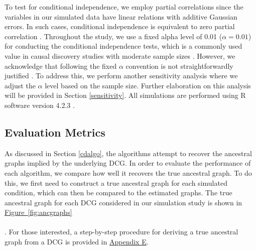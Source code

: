 \documentclass[twoside, 11pt]{article}
\newcommand*{\figref}[2][]{%
  \hyperref[{fig:#2}]{%
    Figure~\ref*{fig:#2}%
    \ifx\\#1\\%
    \else
      #1%
    \fi
  }%
}
\begin{document}
\restoregeometry %

To test for conditional independence, we employ partial correlations since the variables in our simulated data have linear relations with additive Gaussian errors. In such cases, conditional independence is equivalent to zero partial correlation \citep{lawrance_conditional_1976}. Throughout the study, we use a fixed alpha level of 0.01 ($\alpha = 0.01$) for conducting the conditional independence tests, which is a commonly used value in causal discovery studies with moderate sample sizes \citep{malinsky_causal_2018}. However, we acknowledge that following the fixed $\alpha$ convention is not straightforwardly justified \citep{strobl_estimating_2017}. To address this, we perform another sensitivity analysis where we adjust the $\alpha$ level based on the sample size. Further elaboration on this analysis will be provided in Section \ref{sensitivity}. All simulations are performed using R software version 4.2.3 \citep{R}.



\subsection{Evaluation Metrics} \label{eval}
As discussed in Section \ref{cdalgo}, the algorithms attempt to recover the ancestral graphs implied by the underlying DCG. In order to evaluate the performance of each algorithm, we compare how well it recovers the true ancestral graph. To do this, we first need to construct a true ancestral graph for each simulated condition, which can then be compared to the estimated graphs. The true ancestral graph for each DCG considered in our simulation study is shown in \figref[]{ancgraphs}. For those interested, a step-by-step procedure for deriving a true ancestral graph from a DCG is provided in \hyperref[trueancestral]{Appendix E}.
\end{document}
